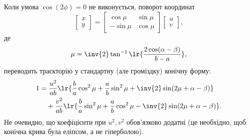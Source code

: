 \begin{enumerate}
{Коли умова \(\cos(2\phi) = 0\) не виконується, поворот координат
\begin{equation}\label{eqn:polarizationReview:200}
\begin{bmatrix}
x \\
y
\end{bmatrix}
=
\begin{bmatrix}
\cos\mu & \sin\mu \\
-\sin\mu & \cos\mu
\end{bmatrix}
\begin{bmatrix}
u \\
v
\end{bmatrix},
\end{equation}
де
\begin{equation}\label{eqn:polarizationReview:220}
\mu = \inv{2} \tan^{-1} \lr{\frac{2 \cos(\alpha - \beta)}{b - a}},
\end{equation}
переводить траєкторію у стандартну (але громіздку) конічну форму:
\begin{equation}\label{eqn:polarizationReview:240}
\begin{aligned}
1 &= \frac{u^2}{ab} \lr{
\frac{b}{a} \cos^2 \mu
+ \frac{a}{b} \sin^2 \mu
+ \inv{2} \sin(2\mu + \alpha - \beta)
} \\
&\quad +
\frac{v^2}{ab} \lr{
\frac{b}{a} \sin^2 \mu
+ \frac{a}{b} \cos^2 \mu
- \inv{2} \sin(2\mu + \alpha - \beta)
}.
\end{aligned}
\end{equation}
Не очевидно, що коефіцієнти при \(u^2, v^2\) обов'язково додатні (це необхідно, щоб конічна крива була еліпсом, а не гіперболою).
}

\end{enumerate}
